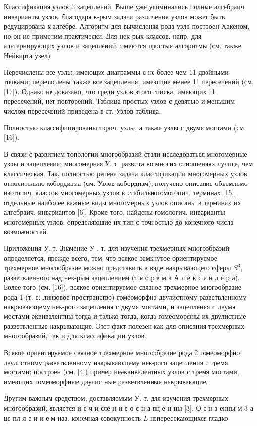 \documentclass[10pt]{article}
\begin{document}
Классификация узлов и зацеплений. Выше уже упоминались полные алгебраич. инварианты узлов, благодаря к-рым задача различения узлов может быть редуцирована к алгебре. Алгоритм для вычисления рода узла построен Хакеном, но он не применим практически. Для нек-рых классов, напр. для альтернирующих узлов и зацеплений, имеются простые алгоритмы (см. также Нейвирта узел).



Перечислены все узлы, имеющие диаграммы с не более чем 11 двойными точками; перечислены также все зацепления, имеющие менее 11 пересечений (см. [17]). Однако не доказано, что среди узлов этого списка, имеющих 11 пересечений, нет повторений. Таблица простых узлов с девятью и меньшим числом пересечений приведена в ст. Узлов таблица.



Полностью классифицированы торич. узлы, а также узлы с двумя мостами (см. [16]).



В связи с развитием топологии многообразий стали исследоваться многомерные узлы и зацепления; многомерная У. т. развита во многих отношениях лучпге, чем классическая. Так, полностью репена задача классификации многомерных узлов относительно кобордизма (см. Узлов кобордизм), получено описание объемлемо изотопич. классов многомерных узлов в стабильногомотопич. терминах [15], отдельные наиболее важные виды многомерных узлов описаны в терминах их алгебраич. инвариантов [6]. Кроме того, найдены гомологич. инварианты многомерных узлов, определяющие их тип с точностью до конечного числа возможностей.



Приложения У. т. Значение У . т. для изучения трехмерных многообразий определяется, прежде всего, тем, что всякое замкнутое ориентируемое трехмерное многообразие можно представить в виде накрывающего сферы $S^{3}$, разветвленного над нек-рым зацеплением (т е о р е м а А л е к с а н д е р а). Более того (см. [16]), всякое ориентируемое связное трехмерное многообразие рода 1 (т. е. линзовое пространство) гомеоморфно двулистному разветвленному накрывающему нек-рого зацепления с двумя мостами, и зацепления с двумя мостами әквивалентны тогда и только тогда, когда гомеоморфны их двулистные разветвленные накрывающие. Этот факт полезен как для описания трехмерных многообразий, так и для классификации узлов.



Всякое ориентируемое связное трехмерное многообразие рода 2 гомеоморфно двулистному разветвленному накрывающему нек-рого зацепления с тремя мостами; построен (см. [4]) пример неәквивалентных узлов с тремя мостами, имеющих гомеоморфные двулистные разветвленные накрывающие.



Другим важным средством, доставляемым У. т. для изучения трехмерных многообразий, является и с ч и сле н и е о с н а пц е н ны [3]. О с н а енны м 3 а це пл л е и и е м наз. конечная совокупность $L$ нспересекающихся гладко
\end{document}

